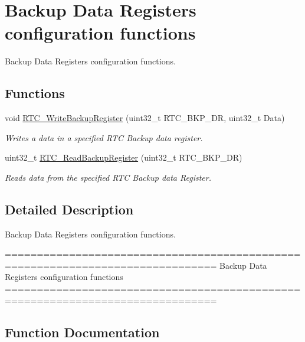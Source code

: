 \hypertarget{group___r_t_c___group10}{}\section{Backup Data Registers configuration functions}
\label{group___r_t_c___group10}


Backup Data Registers configuration functions.  


\subsection*{Functions}
\begin{DoxyCompactItemize}
\item 
void \hyperlink{group___r_t_c___group10_gaa1241e2b47d04acc116b50d7b031c3aa}{R\+T\+C\+\_\+\+Write\+Backup\+Register} (uint32\+\_\+t R\+T\+C\+\_\+\+B\+K\+P\+\_\+\+D\+R, uint32\+\_\+t Data)
\begin{DoxyCompactList}\small\item\em Writes a data in a specified R\+T\+C Backup data register. \end{DoxyCompactList}\item 
uint32\+\_\+t \hyperlink{group___r_t_c___group10_ga504489fd91a66e392beb82bb8230b37f}{R\+T\+C\+\_\+\+Read\+Backup\+Register} (uint32\+\_\+t R\+T\+C\+\_\+\+B\+K\+P\+\_\+\+D\+R)
\begin{DoxyCompactList}\small\item\em Reads data from the specified R\+T\+C Backup data Register. \end{DoxyCompactList}\end{DoxyCompactItemize}


\subsection{Detailed Description}
Backup Data Registers configuration functions. 

\begin{DoxyVerb} ===============================================================================
                       Backup Data Registers configuration functions 
 ===============================================================================  \end{DoxyVerb}
 

\subsection{Function Documentation}
\hypertarget{group___r_t_c___group10_ga504489fd91a66e392beb82bb8230b37f}{}
